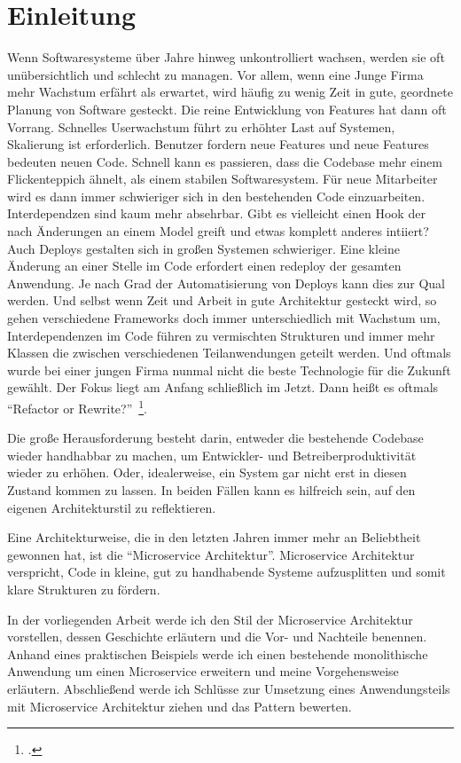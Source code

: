 \chapter{Einleitung}
Wenn Softwaresysteme über Jahre hinweg unkontrolliert wachsen, werden sie oft unübersichtlich und schlecht zu managen. Vor allem, wenn eine Junge Firma mehr Wachstum erfährt als erwartet, wird häufig zu wenig Zeit in gute, geordnete Planung von Software gesteckt. Die reine Entwicklung von Features hat dann oft Vorrang. Schnelles Userwachstum führt zu erhöhter Last auf Systemen, Skalierung ist erforderlich. Benutzer fordern neue Features und neue Features bedeuten neuen Code. Schnell kann es passieren, dass die Codebase mehr einem Flickenteppich ähnelt, als einem stabilen Softwaresystem. Für neue Mitarbeiter wird es dann immer schwieriger sich in den bestehenden Code einzuarbeiten. Interdependzen sind kaum mehr absehrbar. Gibt es vielleicht einen Hook der nach Änderungen an einem Model greift und etwas komplett anderes intiiert? Auch Deploys gestalten sich in großen Systemen schwieriger. Eine kleine Änderung an einer Stelle im Code erfordert einen redeploy der gesamten Anwendung. Je nach Grad der Automatisierung von Deploys kann dies zur Qual werden. Und selbst wenn Zeit und Arbeit in gute Architektur gesteckt wird, so gehen verschiedene Frameworks doch immer unterschiedlich mit Wachstum um, Interdependenzen im Code führen zu vermischten Strukturen und immer mehr Klassen die zwischen verschiedenen Teilanwendungen geteilt werden. Und oftmals wurde bei einer jungen Firma nunmal nicht die beste Technologie für die Zukunft gewählt. Der Fokus liegt am Anfang schließlich im Jetzt. Dann heißt es oftmals ``Refactor or Rewrite?''~\footcite[vgl.][]{refactorrewrite}.

Die große Herausforderung besteht darin, entweder die bestehende Codebase wieder handhabbar zu machen, um Entwickler- und Betreiberproduktivität wieder zu erhöhen. Oder, idealerweise, ein System gar nicht erst in diesen Zustand kommen zu lassen. In beiden Fällen kann es hilfreich sein, auf den eigenen Architekturstil zu reflektieren.

Eine Architekturweise, die in den letzten Jahren immer mehr an Beliebtheit gewonnen hat, ist die ``Microservice Architektur''. Microservice Architektur verspricht, Code in kleine, gut zu handhabende Systeme aufzusplitten und somit klare Strukturen zu fördern.

In der vorliegenden Arbeit werde ich den Stil der Microservice Architektur vorstellen, dessen Geschichte erläutern und die Vor- und Nachteile benennen. Anhand eines praktischen Beispiels werde ich einen bestehende monolithische Anwendung um einen Microservice erweitern und meine Vorgehensweise erläutern.
Abschließend werde ich Schlüsse zur Umsetzung eines Anwendungsteils mit Microservice Architektur ziehen und das Pattern bewerten.